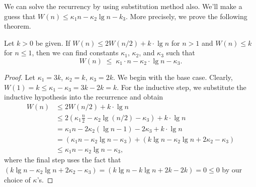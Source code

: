 \begin{cluster}
\label{grp:grm:mcss::solve}

\begin{gram}
\label{grm:mcss::solve}
We can solve the recurrency by using substitution method also.  We'll
make a guess that $W(n) \leq \kappa_1 n - \kappa_2 \lg n - k_3$.
More precisely, we prove the following theorem.

\end{gram}
\end{cluster}

\begin{flex}
\label{grp:grm:mcss::given}

\begin{gram}
\label{grm:mcss::given}
\begin{theorem}
  Let $k > 0$ be given.  If $W(n) \leq 2 W(n/2) + k \cdot \lg n$ for $n > 1$
  and $W(n) \leq k$ for $n \leq 1$, then we can find constants $\kappa_1$,
  $\kappa_2$, and $\kappa_3$ such that \[ W(n) \;\leq\; \kappa_1 \cdot n -
  \kappa_2 \cdot \lg n - \kappa_3.\]
\end{theorem}
\begin{proof}
  Let $\kappa_1 = 3k$, $\kappa_2 = k$, $\kappa_3 = 2k$. We begin with
  the base case. Clearly, $W(1) = k \leq \kappa_1 - \kappa_3 = 3k - 2k = k$.
  For the inductive step, we substitute the inductive hypothesis into
  the recurrence and obtain
  \[ \begin{align*}
    W(n) &\leq 2W(n/2) + k \cdot \lg n\\
    &\leq 2 (\kappa_1 \tfrac{n}2 - \kappa_2 \lg (n/2) - \kappa_3) + k \cdot\lg n\\
    &= \kappa_1 n - 2 \kappa_2 (\lg n - 1) - 2 \kappa_3 + k \cdot \lg n\\
    &= (\kappa_1 n - \kappa_2 \lg n - \kappa_3) +
    (k \lg n - \kappa_2 \lg n + 2 \kappa_2 - \kappa_3) \\
    &\leq \kappa_1 n - \kappa_2 \lg n - \kappa_3,
  \end{align*} \]
  where the final step uses the fact that $(k \lg n - \kappa_2 \lg n +
  2 \kappa_2 - \kappa_3) = (k \lg n - k \lg n + 2 k - 2 k) = 0 
 \leq 0$ by our choice of $\kappa$'s.
\end{proof}

\end{gram}
\end{flex}

